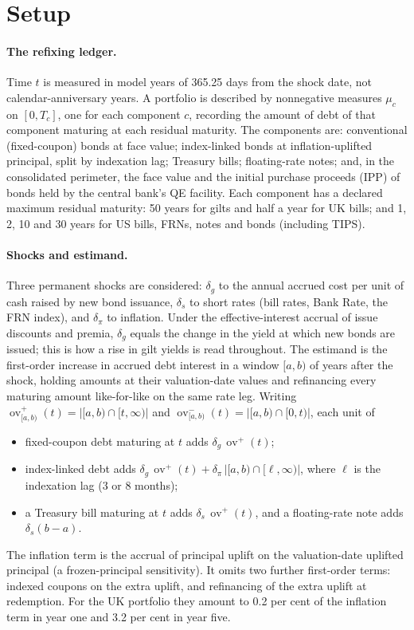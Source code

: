 \documentclass[11pt,a4paper]{article}
\theoremstyle{remark}
\newcommand{\ov}{\operatorname{ov}}
\begin{document}
\section{Setup}\label{sec:setup}

\paragraph{The refixing ledger.} Time $t$ is measured in model years of 365.25 days from the shock date, not calendar-anniversary years. A portfolio is described by nonnegative measures $\mu_c$ on $[0,T_c]$, one for each component $c$, recording the amount of debt of that component maturing at each residual maturity. The components are: conventional (fixed-coupon) bonds at face value; index-linked bonds at inflation-uplifted principal, split by indexation lag; Treasury bills; floating-rate notes; and, in the consolidated perimeter, the face value and the initial purchase proceeds (IPP) of bonds held by the central bank's QE facility. Each component has a declared maximum residual maturity: 50 years for gilts and half a year for UK bills; and 1, 2, 10 and 30 years for US bills, FRNs, notes and bonds (including TIPS).

\paragraph{Shocks and estimand.} Three permanent shocks are considered: $\delta_g$ to the annual accrued cost per unit of cash raised by new bond issuance, $\delta_s$ to short rates (bill rates, Bank Rate, the FRN index), and $\delta_\pi$ to inflation. Under the effective-interest accrual of issue discounts and premia, $\delta_g$ equals the change in the yield at which new bonds are issued; this is how a rise in gilt yields is read throughout. The estimand is the first-order increase in accrued debt interest in a window $[a,b)$ of years after the shock, holding amounts at their valuation-date values and refinancing every maturing amount like-for-like on the same rate leg. Writing $\ov^+_{[a,b)}(t) = |[a,b)\cap[t,\infty)|$ and $\ov^-_{[a,b)}(t) = |[a,b)\cap[0,t)|$, each unit of
\begin{itemize}
\item fixed-coupon debt maturing at $t$ adds $\delta_g\,\ov^+(t)$;
\item index-linked debt adds $\delta_g\,\ov^+(t) + \delta_\pi\,|[a,b)\cap[\ell,\infty)|$, where $\ell$ is the indexation lag (3 or 8 months);
\item a Treasury bill maturing at $t$ adds $\delta_s\,\ov^+(t)$, and a floating-rate note adds $\delta_s (b-a)$.
\end{itemize}
The inflation term is the accrual of principal uplift on the valuation-date uplifted principal (a frozen-principal sensitivity). It omits two further first-order terms: indexed coupons on the extra uplift, and refinancing of the extra uplift at redemption. For the UK portfolio they amount to 0.2 per cent of the inflation term in year one and 3.2 per cent in year five.
\end{document}

